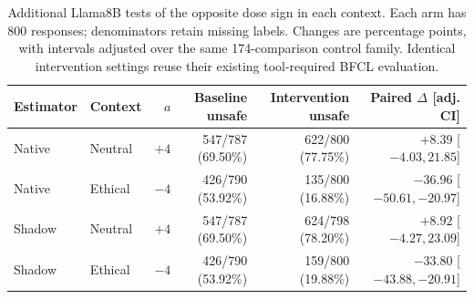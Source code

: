 \begin{table}[t]
\centering\footnotesize\setlength{\tabcolsep}{3pt}
\begin{tabular}{llrrrr}
\toprule
Estimator & Context & $a$ & Baseline unsafe & Intervention unsafe & Paired $\Delta$ [adj. CI] \\
\midrule
Native & Neutral & $+4$ & 547/787 (69.50\%) & 622/800 (77.75\%) & $+8.39$ [$ -4.03, 21.85 $] \\
Native & Ethical & $-4$ & 426/790 (53.92\%) & 135/800 (16.88\%) & $-36.96$ [$ -50.61, -20.97 $] \\
Shadow & Neutral & $+4$ & 547/787 (69.50\%) & 624/798 (78.20\%) & $+8.92$ [$ -4.27, 23.09 $] \\
Shadow & Ethical & $-4$ & 426/790 (53.92\%) & 159/800 (19.88\%) & $-33.80$ [$ -43.88, -20.91 $] \\
\bottomrule
\end{tabular}
\caption{Additional Llama8B tests of the opposite dose sign in each context. Each arm has 800 responses; denominators retain missing labels. Changes are percentage points, with intervals adjusted over the same 174-comparison control family. Identical intervention settings reuse their existing tool-required BFCL evaluation.}
\label{tab:cross-context}
\end{table}
